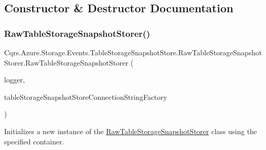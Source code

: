 \subsection{Constructor \& Destructor Documentation}
\mbox{\label{classCqrs_1_1Azure_1_1Storage_1_1Events_1_1TableStorageSnapshotStore_1_1RawTableStorageSnapshotStorer_a76c9bac0cbad526e8b7b53c7eccce23f_a76c9bac0cbad526e8b7b53c7eccce23f}} 
\subsubsection{\texorpdfstring{Raw\+Table\+Storage\+Snapshot\+Storer()}{RawTableStorageSnapshotStorer()}}
{\footnotesize\ttfamily Cqrs.\+Azure.\+Storage.\+Events.\+Table\+Storage\+Snapshot\+Store.\+Raw\+Table\+Storage\+Snapshot\+Storer.\+Raw\+Table\+Storage\+Snapshot\+Storer (\begin{DoxyParamCaption}\item[{I\+Logger}]{logger,  }\item[{\hyperlink{interfaceCqrs_1_1Azure_1_1BlobStorage_1_1ITableStorageSnapshotStoreConnectionStringFactory}{I\+Table\+Storage\+Snapshot\+Store\+Connection\+String\+Factory}}]{table\+Storage\+Snapshot\+Store\+Connection\+String\+Factory }\end{DoxyParamCaption})}



Initializes a new instance of the \hyperlink{classCqrs_1_1Azure_1_1Storage_1_1Events_1_1TableStorageSnapshotStore_1_1RawTableStorageSnapshotStorer}{Raw\+Table\+Storage\+Snapshot\+Storer} class using the specified container. 



